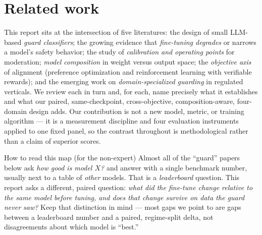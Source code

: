\section{Related work}
\label{sec:related}

This report sits at the intersection of five literatures: the design of small LLM-based
\emph{guard classifiers}; the growing evidence that \emph{fine-tuning degrades} or narrows a
model's safety behavior; the study of \emph{calibration and operating points} for moderation;
\emph{model composition} in weight versus output space; the \emph{objective axis} of alignment
(preference optimization and reinforcement learning with verifiable rewards); and the emerging work
on \emph{domain-specialized guarding} in regulated verticals. We review each in turn and, for each,
name precisely what it establishes and what our paired, same-checkpoint, cross-objective,
composition-aware, four-domain design adds. Our contribution is not a new model, metric, or training
algorithm --- it is a measurement discipline and four evaluation instruments applied to one fixed
panel, so the contrast throughout is methodological rather than a claim of superior scores.

\begin{background}{How to read this map (for the non-expert)}
Almost all of the ``guard'' papers below ask \emph{how good is model $X$?} and answer with a single
benchmark number, usually next to a table of \emph{other} models. That is a \emph{leaderboard}
question. This report asks a different, paired question: \emph{what did the fine-tune change relative
to the same model before tuning, and does that change survive on data the guard never saw?} Keep that
distinction in mind --- most gaps we point to are gaps between a leaderboard number and a paired,
regime-split delta, not disagreements about which model is ``best.''
\end{background}

